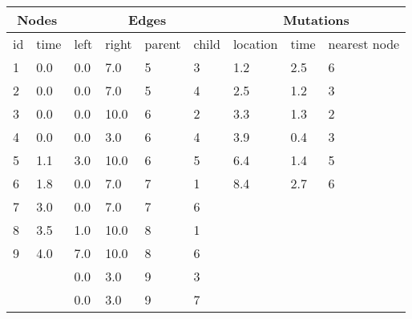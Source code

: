 \begin{center}
{\footnotesize
\begin{tabularx}{1\textwidth}{p{0.5cm}p{0.8cm}|p{0.8cm}p{0.8cm}p{0.8cm}p{0.8cm}|p{1.5cm}p{1cm}X}
\toprule
\multicolumn{2}{c}{\bf Nodes} & \multicolumn{4}{c}{\bf Edges} & \multicolumn{3}{c}{\bf Mutations}\\
\midrule
id & time &
left & right & parent & child &
location & time & nearest node\\
\midrule
1 & 0.0 &
0.0 & 7.0 & 5 & 3 &
1.2 & 2.5 & 6 \\
2 & 0.0 &
0.0 & 7.0 & 5 & 4 &
2.5 & 1.2 & 3\\
3 & 0.0 &
0.0 & 10.0 & 6 & 2 &
3.3 & 1.3 & 2\\
4 & 0.0 &
0.0 & 3.0 & 6 & 4 &
3.9 & 0.4 & 3\\
5 & 1.1 &
3.0 & 10.0 & 6 & 5 &
6.4 & 1.4 & 5\\
6 & 1.8 &
0.0 & 7.0 & 7 & 1 &
8.4 & 2.7 & 6 \\
7 & 3.0 &
0.0 & 7.0 & 7 & 6 &
& &\\
8 & 3.5 &
1.0 & 10.0 & 8 & 1 &
& &\\
9 & 4.0 &
7.0 & 10.0 & 8 & 6 &
& &\\
& & 
0.0 & 3.0 & 9 & 3 &
& &\\
& & 
0.0 & 3.0 & 9 & 7 &
& &\\
\bottomrule
\end{tabularx}
}
\end{center}
